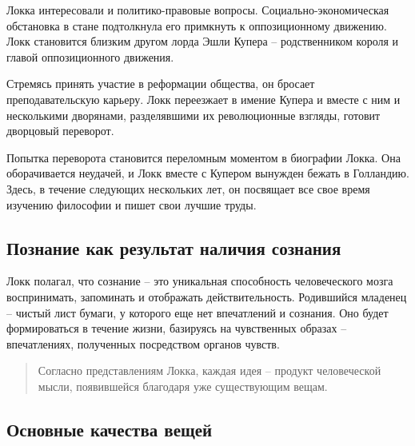 \documentclass[
]{article}
\begin{document}
Локка интересовали и политико-правовые вопросы. Социально-экономическая
обстановка в стане подтолкнула его примкнуть к оппозиционному движению.
Локк становится близким другом лорда Эшли Купера -- родственником короля
и главой оппозиционного движения.

Стремясь принять участие в реформации общества, он бросает
преподавательскую карьеру. Локк переезжает в имение Купера и вместе с
ним и несколькими дворянами, разделявшими их революционные взгляды,
готовит дворцовый переворот.

Попытка переворота становится переломным моментом в биографии Локка. Она
оборачивается неудачей, и Локк вместе с Купером вынужден бежать в
Голландию. Здесь, в течение следующих нескольких лет, он посвящает все
свое время изучению философии и пишет свои лучшие труды.

\hypertarget{ux43fux43eux437ux43dux430ux43dux438ux435-ux43aux430ux43a-ux440ux435ux437ux443ux43bux44cux442ux430ux442-ux43dux430ux43bux438ux447ux438ux44f-ux441ux43eux437ux43dux430ux43dux438ux44f}{%
\subsection{Познание как результат наличия
сознания}\label{ux43fux43eux437ux43dux430ux43dux438ux435-ux43aux430ux43a-ux440ux435ux437ux443ux43bux44cux442ux430ux442-ux43dux430ux43bux438ux447ux438ux44f-ux441ux43eux437ux43dux430ux43dux438ux44f}}

Локк полагал, что сознание -- это уникальная способность человеческого
мозга воспринимать, запоминать и отображать действительность. Родившийся
младенец -- чистый лист бумаги, у которого еще нет впечатлений и
сознания. Оно будет формироваться в течение жизни, базируясь на
чувственных образах -- впечатлениях, полученных посредством органов
чувств.

\begin{quote}
Согласно представлениям Локка, каждая идея -- продукт человеческой
мысли, появившейся благодаря уже существующим вещам.
\end{quote}

\hypertarget{ux43eux441ux43dux43eux432ux43dux44bux435-ux43aux430ux447ux435ux441ux442ux432ux430-ux432ux435ux449ux435ux439}{%
\subsection{Основные качества
вещей}\label{ux43eux441ux43dux43eux432ux43dux44bux435-ux43aux430ux447ux435ux441ux442ux432ux430-ux432ux435ux449ux435ux439}}
\end{document}
